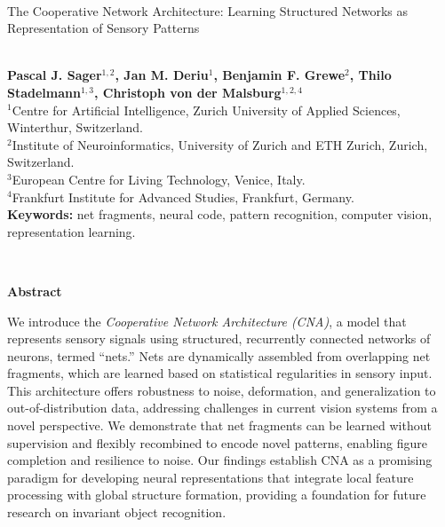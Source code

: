 \documentclass[12pt]{article}
\begin{document}
\hspace{13.9cm}

\ \vspace{20mm}\\

\begin{center}
    {\LARGE The Cooperative Network Architecture: Learning Structured Networks as Representation of Sensory Patterns}
\end{center}
\ \\
{\bf \large Pascal J. Sager$^{\displaystyle 1, \displaystyle 2}$, Jan M. Deriu$^{\displaystyle 1}$, Benjamin F. Grewe$^{\displaystyle 2}$, Thilo Stadelmann$^{\displaystyle 1, \displaystyle 3}$, Christoph von der Malsburg$^{\displaystyle 1, \displaystyle 2, \displaystyle 4}$}\\
{$^{\displaystyle 1}$Centre for Artificial Intelligence, Zurich University of Applied Sciences, Winterthur, Switzerland.}\\
{$^{\displaystyle 2}$Institute of Neuroinformatics, University of Zurich and ETH Zurich, Zurich, Switzerland.}\\
{$^{\displaystyle 3}$European Centre for Living Technology, Venice, Italy.}\\
{$^{\displaystyle 4}$Frankfurt Institute for Advanced Studies, Frankfurt, Germany.}\\
%

{\bf Keywords:} net fragments, neural code, pattern recognition, computer vision, representation learning.

\thispagestyle{empty}
%
\ \vspace{-0mm}\\
%
\newpage
\begin{center} {\bf Abstract} \end{center}
We introduce the \emph{Cooperative Network Architecture (CNA)}, a model that represents sensory signals using structured, recurrently connected networks of neurons, termed ``nets.'' Nets are dynamically assembled from overlapping net fragments, which are learned based on statistical regularities in sensory input. This architecture offers robustness to noise, deformation, and generalization to out-of-distribution data, addressing challenges in current vision systems from a novel perspective. We demonstrate that net fragments can be learned without supervision and flexibly recombined to encode novel patterns, enabling figure completion and resilience to noise. Our findings establish CNA as a promising paradigm for developing neural representations that integrate local feature processing with global structure formation, providing a foundation for future research on invariant object recognition.
\end{document}

